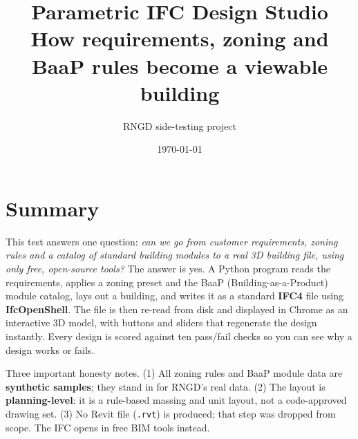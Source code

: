 \documentclass[11pt]{article}
\title{Parametric IFC Design Studio\\\large How requirements, zoning and BaaP rules become a viewable building}
\author{RNGD side-testing project}
\date{\today}
\begin{document}
\maketitle
\tableofcontents

\section{Summary}
This test answers one question: \emph{can we go from customer requirements, zoning rules and a catalog of standard building modules to a real
3D building file, using only free, open-source tools?} The answer is yes. A Python program reads the requirements, applies a zoning preset and the
BaaP (Building-as-a-Product) module catalog, lays out a building, and writes it as a standard \textbf{IFC4} file using \textbf{IfcOpenShell}. The file
is then re-read from disk and displayed in Chrome as an interactive 3D model, with buttons and sliders that regenerate the design instantly. Every
design is scored against ten pass/fail checks so you can see why a design works or fails.

Three important honesty notes. (1) All zoning rules and BaaP module data are \textbf{synthetic samples}; they stand in for RNGD's real data. (2) The layout is
\textbf{planning-level}: it is a rule-based massing and unit layout, not a code-approved drawing set. (3) No Revit file (\texttt{.rvt}) is produced; that
step was dropped from scope. The IFC opens in free BIM tools instead.
\end{document}
